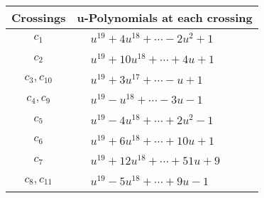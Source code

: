 \documentclass[1p]{elsarticle_modified}
\theoremstyle{definition}
\begin{document}
\begin{tabular}{m{50pt}|m{274pt}}
Crossings & \hspace{64pt}u-Polynomials at each crossing \\
\hline $$\begin{aligned}c_{1}\end{aligned}$$&$\begin{aligned}
&u^{19}+4 u^{18}+\cdots-2 u^2+1
\end{aligned}$\\
\hline $$\begin{aligned}c_{2}\end{aligned}$$&$\begin{aligned}
&u^{19}+10 u^{18}+\cdots+4 u+1
\end{aligned}$\\
\hline $$\begin{aligned}c_{3},c_{10}\end{aligned}$$&$\begin{aligned}
&u^{19}+3 u^{17}+\cdots- u+1
\end{aligned}$\\
\hline $$\begin{aligned}c_{4},c_{9}\end{aligned}$$&$\begin{aligned}
&u^{19}- u^{18}+\cdots-3 u-1
\end{aligned}$\\
\hline $$\begin{aligned}c_{5}\end{aligned}$$&$\begin{aligned}
&u^{19}-4 u^{18}+\cdots+2 u^2-1
\end{aligned}$\\
\hline $$\begin{aligned}c_{6}\end{aligned}$$&$\begin{aligned}
&u^{19}+6 u^{18}+\cdots+10 u+1
\end{aligned}$\\
\hline $$\begin{aligned}c_{7}\end{aligned}$$&$\begin{aligned}
&u^{19}+12 u^{18}+\cdots+51 u+9
\end{aligned}$\\
\hline $$\begin{aligned}c_{8},c_{11}\end{aligned}$$&$\begin{aligned}
&u^{19}-5 u^{18}+\cdots+9 u-1
\end{aligned}$\\
\hline
\end{tabular}\\~\\
\end{document}
